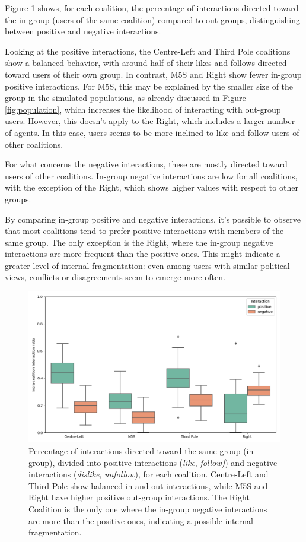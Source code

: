 Figure \ref{fig:interactions_inout} shows, for each coalition, the percentage of interactions directed toward the in-group (users of the same coalition) compared to out-groups, distinguishing between positive and negative interactions.

Looking at the positive interactions, the Centre-Left and Third Pole coalitions show a balanced behavior, with around half of their likes and follows directed toward users of their own group.
In contrast, M5S and Right show fewer in-group positive interactions.
For M5S, this may be explained by the smaller size of the group in the simulated populations, as already discussed in Figure \ref{fig:population}, which increases the likelihood of interacting with out-group users.
However, this doesn't apply to the Right, which includes a larger number of agents. In this case, users seems to be more inclined to like and follow users of other coalitions.

For what concerns the negative interactions, these are mostly directed toward users of other coalitions.
In-group negative interactions are low for all coalitions, with the exception of the Right, which shows higher values with respect to other groups.

By comparing in-group positive and negative interactions, it's possible to observe that most coalitions tend to prefer positive interactions with members of the same group.
The only exception is the Right, where the in-group negative interactions are more frequent than the positive ones.
This might indicate a greater level of internal fragmentation: even among users with similar political views, conflicts or disagreements seem to emerge more often.


\begin{figure}[h]
    \centering
    \includegraphics[width=0.6\linewidth]{Images/Interactions/pos_neg_in_DefaultRecSys.png}
    \caption{Percentage of interactions directed toward the same group (in-group), divided into positive interactions (\textit{like}, \textit{follow)}) and negative interactions (\textit{dislike}, \textit{unfollow}), for each coalition.
    Centre-Left and Third Pole show balanced in and out interactions, while M5S and Right have higher positive out-group interactions.
    The Right Coalition is the only one where the in-group negative interactions are more than the positive ones, indicating a possible internal fragmentation.}
    \label{fig:interactions_inout}
\end{figure}


